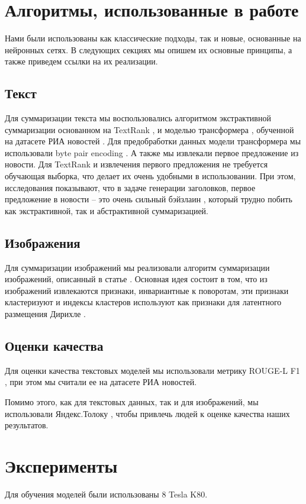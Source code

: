 \documentclass[aps,%
12pt,%
final,%
oneside,
onecolumn,%
musixtex, %
superscriptaddress,%
centertags]{article} %
\begin{document}
\section{Алгоритмы, использованные в работе}
Нами были использованы как классические подходы, так и новые, основанные на нейронных сетях.
В следующих секциях мы опишем их основные принципы, а также приведем ссылки на их реализации.

\subsection{Текст}
Для суммаризации текста мы воспользовались алгоритмом экстрактивной суммаризации
основанном на TextRank \cite{}, и моделью трансформера \cite{}, обученной на
датасете РИА новостей \cite{}. Для предобработки данных модели трансформера мы
использовали byte pair encoding \cite{}.
А также мы извлекали первое предложение из новости.
Для TextRank и извлечения первого предложения не требуется обучающая выборка, что
делает их очень удобными в использовании. При этом, исследования показывают, что
в задаче генерации заголовков, первое предложение в новости -- это очень сильный бэйзлаин \cite{},
который трудно побить как экстрактивной, так и абстрактивной суммаризацией.

\subsection{Изображения}
Для суммаризации изображений мы реализовали алгоритм суммаризации изображений,
описанный в статье \cite{}. Основная идея состоит в том, что из изображений извлекаются
признаки, инвариантные к поворотам, эти признаки кластеризуют и индексы кластеров
используют как признаки для латентного размещения Дирихле \cite{}.

\subsection{Оценки качества}
Для оценки качества текстовых моделей мы использовали метрику ROUGE-L F1 \cite{}, при этом
мы считали ее на датасете РИА новостей.

Помимо этого, как для текстовых данных, так и для изображений, мы  использовали
Яндекс.Толоку \cite{}, чтобы привлечь людей к оценке качества наших результатов.

\section{Эксперименты}
Для обучения моделей были использованы 8 Tesla K80.
\end{document}
